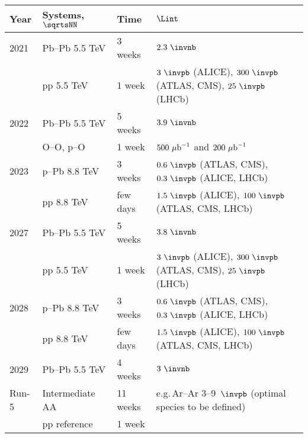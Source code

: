 \documentclass[../report.tex]{subfiles}
\begin{document}
\begin{center}
\begin{tabular}{llll}
Year & Systems, $\sqrtsNN$ & Time & $\Lint$ \\
\hline
2021 &  Pb--Pb 5.5 TeV & 3 weeks & $2.3~\invnb$ \\
     &  pp 5.5 TeV & 1 week & $3~\invpb$ (ALICE), $300~\invpb$ (ATLAS, CMS), $25~\invpb$ (LHCb)  \\
\hline
2022 &  Pb--Pb 5.5 TeV & 5 weeks & $3.9~\invnb$ \\
     &  O--O, p--O & 1 week & $500~{\rm \mu b}^{-1}$ and $200~{\rm \mu b}^{-1}$ \\
\hline
2023 &  p--Pb 8.8 TeV & 3 weeks & $0.6~\invpb$ (ATLAS, CMS), $0.3~\invpb$ (ALICE, LHCb) \\
     &  pp 8.8 TeV & few days & $1.5~\invpb$ (ALICE), $100~\invpb$ (ATLAS, CMS, LHCb)  \\
\hline
2027 &  Pb--Pb 5.5 TeV & 5 weeks & $3.8~\invnb$ \\
     &  pp 5.5 TeV & 1 week & $3~\invpb$ (ALICE), $300~\invpb$ (ATLAS, CMS), $25~\invpb$ (LHCb)  \\
\hline
2028 &  p--Pb 8.8 TeV & 3 weeks & $0.6~\invpb$ (ATLAS, CMS), $0.3~\invpb$ (ALICE, LHCb) \\
     &  pp 8.8 TeV & few days & $1.5~\invpb$ (ALICE), $100~\invpb$ (ATLAS, CMS, LHCb)  \\
\hline
2029 &  Pb--Pb 5.5 TeV & 4 weeks & $3~\invnb$ \\
\hline
Run-5 & Intermediate AA & 11 weeks & e.g.\,Ar--Ar 3--9~$\invpb$ (optimal species to be defined) \\
     &  pp reference & 1 week & \\
\hline
\end{tabular}
\end{center}
\end{document}
